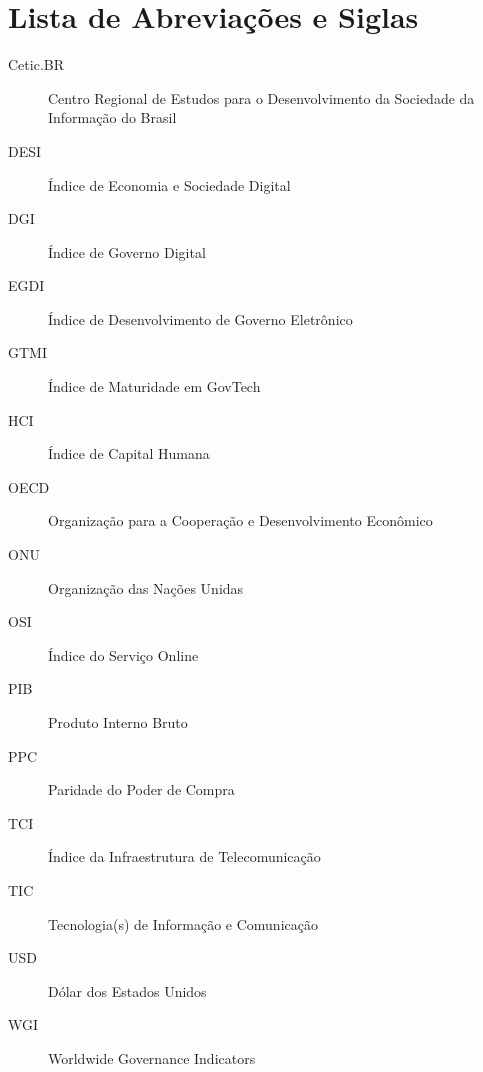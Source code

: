 \chapter*{Lista de Abreviações e Siglas}

\begin{description}
    \item[Cetic.BR] Centro Regional de Estudos para o Desenvolvimento da Sociedade da Informação do Brasil
    \item[DESI] Índice de Economia e Sociedade Digital
    \item[DGI] Índice de Governo Digital
    \item[EGDI] Índice de Desenvolvimento de Governo Eletrônico
    \item[GTMI] Índice de Maturidade em GovTech
    \item[HCI] Índice de Capital Humana
    \item[OECD] Organização para a Cooperação e Desenvolvimento Econômico
    \item[ONU] Organização das Nações Unidas
    \item[OSI] Índice do Serviço Online
    \item[PIB] Produto Interno Bruto
    \item[PPC] Paridade do Poder de Compra
    \item[TCI] Índice da Infraestrutura de Telecomunicação
    \item[TIC] Tecnologia(s) de Informação e Comunicação
    \item[USD] Dólar dos Estados Unidos
    \item[WGI] Worldwide Governance Indicators
\end{description}